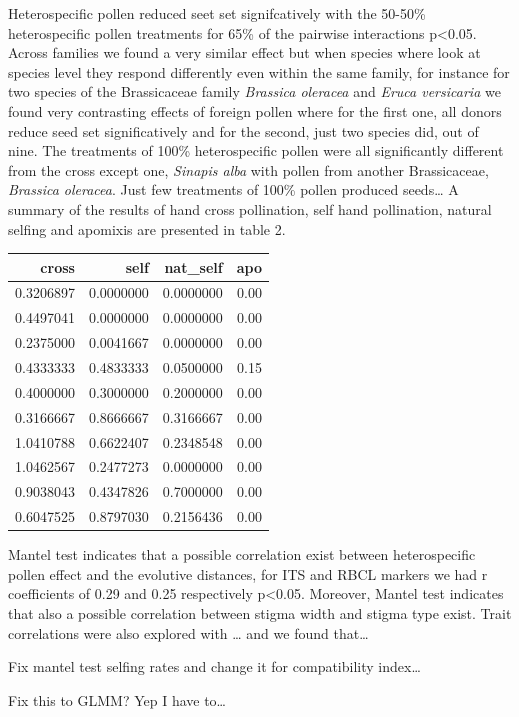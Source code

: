 \documentclass[11pt,a4paper]{article}
\begin{document}
Heterospecific pollen reduced seet set signifcatively with the 50-50\%
heterospecific pollen treatments for 65\% of the pairwise interactions
p\textless{}0.05. Across families we found a very similar effect but
when species where look at species level they respond differently even
within the same family, for instance for two species of the Brassicaceae
family \emph{Brassica oleracea} and \emph{Eruca versicaria} we found
very contrasting effects of foreign pollen where for the first one, all
donors reduce seed set significatively and for the second, just two
species did, out of nine. The treatments of 100\% heterospecific pollen
were all significantly different from the cross except one,
\emph{Sinapis alba} with pollen from another Brassicaceae,
\emph{Brassica oleracea}. Just few treatments of 100\% pollen produced
seeds\ldots{} A summary of the results of hand cross pollination, self
hand pollination, natural selfing and apomixis are presented in table 2.

\begin{longtable}[]{@{}rrrr@{}}
\toprule
cross & self & nat\_self & apo\tabularnewline
\midrule
\endhead
0.3206897 & 0.0000000 & 0.0000000 & 0.00\tabularnewline
0.4497041 & 0.0000000 & 0.0000000 & 0.00\tabularnewline
0.2375000 & 0.0041667 & 0.0000000 & 0.00\tabularnewline
0.4333333 & 0.4833333 & 0.0500000 & 0.15\tabularnewline
0.4000000 & 0.3000000 & 0.2000000 & 0.00\tabularnewline
0.3166667 & 0.8666667 & 0.3166667 & 0.00\tabularnewline
1.0410788 & 0.6622407 & 0.2348548 & 0.00\tabularnewline
1.0462567 & 0.2477273 & 0.0000000 & 0.00\tabularnewline
0.9038043 & 0.4347826 & 0.7000000 & 0.00\tabularnewline
0.6047525 & 0.8797030 & 0.2156436 & 0.00\tabularnewline
\bottomrule
\end{longtable}

Mantel test indicates that a possible correlation exist between
heterospecific pollen effect and the evolutive distances, for ITS and
RBCL markers we had r coefficients of 0.29 and 0.25 respectively
p\textless{}0.05. Moreover, Mantel test indicates that also a possible
correlation between stigma width and stigma type exist. Trait
correlations were also explored with \ldots{} and we found that\ldots{}

Fix mantel test selfing rates and change it for compatibility
index\ldots{}

Fix this to GLMM? Yep I have to\ldots{}
\end{document}
